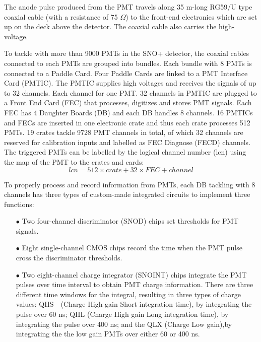 The anode pulse produced from the PMT travels along 35 m-long RG59/U type coaxial cable (with a resistance of 75 $\Omega$) to the front-end electronics which are set up on the deck above the detector. The coaxial cable also carries the high-voltage\cite{boger2000sudbury}. 

To tackle with more than 9000 PMTs in the SNO+ detector, the coaxial cables connected to each PMTs are grouped into bundles. Each bundle with 8 PMTs is connected to a Paddle Card. Four Paddle Cards are linked to a PMT Interface Card (PMTIC). The PMTIC supplies high voltages and receives the signals of up to 32 channels. Each channel for one PMT. 32 channels in PMTIC are plugged to a Front End Card (FEC) that processes, digitizes and stores PMT signals. Each FEC has 4 Daughter Boards (DB) and each DB handles 8 channels. 16 PMTICs and FECs are inserted in one electronic crate and thus each crate processes 512 PMTs. 19 crates tackle 9728 PMT channels in total, of which 32 channels are reserved for calibration inputs and labelled as FEC Diagnose (FECD) channels. The triggered PMTs can be labelled by the logical channel number (lcn) using the map of the PMT to the crates and cards\cite{snop_nim,stringer2019sensitivity}:
\begin{equation}
lcn = 512 \times crate + 32 \times FEC + channel
\end{equation}
 
To properly process and record information from PMTs, each DB tackling with 8 channels has three types of custom-made integrated circuits to implement three functions\cite{boger2000sudbury,bonventre2014neutron,snop_nim}:
\begin{itemize} 
\item[$\bullet$] Two four-channel discriminator (SNOD) chips set thresholds for PMT signals.
\item[$\bullet$] Eight single-channel CMOS chips record the time when the PMT pulse cross the discriminator thresholds.
\item[$\bullet$] Two eight-channel charge integrator (SNOINT) chips integrate the PMT pulses over time interval to obtain PMT charge information. There are three different time windows for the integral, resulting in three types of charge values: QHS　(Charge High gain Short integration time), by integrating the pulse over 60 ns; QHL (Charge High gain Long integration time), by integrating the pulse over 400 ns; and the QLX (Charge Low gain),by integrating the the low gain PMTs over either 60 or 400 ns.
\end{itemize}

